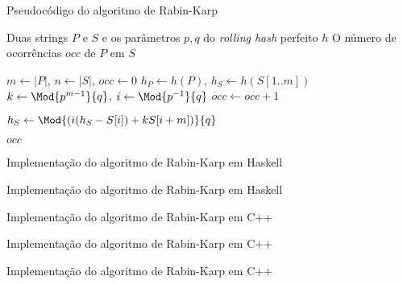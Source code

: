 \begin{frame}[fragile]{Pseudocódigo do algoritmo de Rabin-Karp}

    \begin{algorithm}[H]
        \caption{Algoritmo de Rabin-Karp com \textit{hash} perfeito}
        \begin{algorithmic}[1]
            \Require Duas strings $P$ e $S$ e os parâmetros $p, q$ do \textit{rolling hash} perfeito $h$
            \Ensure O número de ocorrências $occ$ de $P$ em $S$

                \State $m \gets |P|$, $n \gets |S|$, $occ \gets 0$
                \State $h_P \gets h(P)$, $h_S \gets h(S[1..m])$
                \State $k \gets \Mod{p^{m - 1}}{q}$, $i \gets \Mod{p^{-1}}{q}$
                \State
                        \State $occ \gets occ + 1$
                    \EndIf

                        \State $h_S \gets \Mod{\left(i(h_S - S[i]) + kS[i + m]\right)}{q}$
                    \EndIf
                \EndFor

                \State \Return $occ$
            \EndFunction
        \end{algorithmic}
    \end{algorithm}

\end{frame}

\begin{frame}[fragile]{Implementação do algoritmo de Rabin-Karp em Haskell}
\end{frame}

\begin{frame}[fragile]{Implementação do algoritmo de Rabin-Karp em Haskell}
\end{frame}

\begin{frame}[fragile]{Implementação do algoritmo de Rabin-Karp em C++}
\end{frame}

\begin{frame}[fragile]{Implementação do algoritmo de Rabin-Karp em C++}
\end{frame}

\begin{frame}[fragile]{Implementação do algoritmo de Rabin-Karp em C++}
\end{frame}
